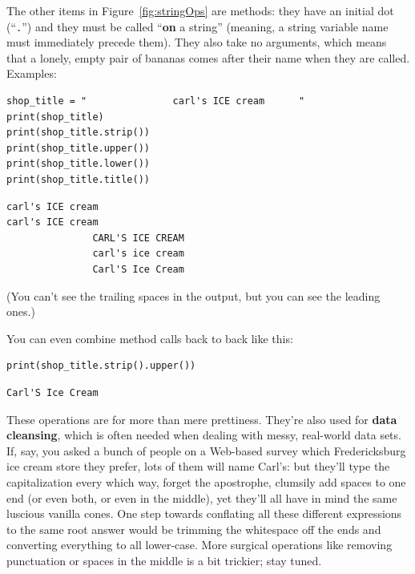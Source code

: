 The other items in Figure~\ref{fig:stringOps} are methods: they have an initial
dot (``\texttt{.}'') and they must be called ``\textbf{on} a string'' (meaning,
a string variable name must immediately precede them). They also take no
arguments, which means that a lonely, empty pair of bananas comes after their
name when they are called. Examples:

\begin{Verbatim}[fontsize=\small,samepage=true,frame=single,framesep=3mm]
shop_title = "               carl's ICE cream      "
print(shop_title)
print(shop_title.strip())
print(shop_title.upper())
print(shop_title.lower())
print(shop_title.title())
\end{Verbatim}

\begin{Verbatim}[fontsize=\small,samepage=true,frame=leftline,framesep=5mm,framerule=1mm]
               carl's ICE cream         
carl's ICE cream
               CARL'S ICE CREAM         
               carl's ice cream         
               Carl'S Ice Cream         
\end{Verbatim}

(You can't see the trailing spaces in the output, but you can see the leading
ones.)

You can even combine method calls back to back like this:

\begin{Verbatim}[fontsize=\small,samepage=true,frame=single,framesep=3mm]
print(shop_title.strip().upper())
\end{Verbatim}

\begin{Verbatim}[fontsize=\small,samepage=true,frame=leftline,framesep=5mm,framerule=1mm]
Carl'S Ice Cream
\end{Verbatim}

These operations are for more than mere prettiness. They're also used for
\textbf{data cleansing}, which is often needed when dealing with messy,
real-world data sets. If, say, you asked a bunch of people on a Web-based
survey which Fredericksburg ice cream store they prefer, lots of them will name
Carl's: but they'll type the capitalization every which way, forget the
apostrophe, clumsily add spaces to one end (or even both, or even in the
middle), yet they'll all have in mind the same luscious vanilla cones. One step
towards conflating all these different expressions to the same root answer
would be trimming the whitespace off the ends and converting everything to all
lower-case. More surgical operations like removing punctuation or spaces in the
middle is a bit trickier; stay tuned.

